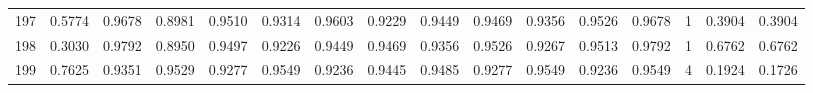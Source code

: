 \begin{tabular}{lrrrrrrrrrrrrrrr}
197 &      0.5774 &  0.9678 &  0.8981 &  0.9510 &  0.9314 &  0.9603 &  0.9229 &  0.9449 &  0.9469 &  0.9356 &   0.9526 &     0.9678 &      1 &                    0.3904 &                     0.3904 \\
198 &      0.3030 &  0.9792 &  0.8950 &  0.9497 &  0.9226 &  0.9449 &  0.9469 &  0.9356 &  0.9526 &  0.9267 &   0.9513 &     0.9792 &      1 &                    0.6762 &                     0.6762 \\
199 &      0.7625 &  0.9351 &  0.9529 &  0.9277 &  0.9549 &  0.9236 &  0.9445 &  0.9485 &  0.9277 &  0.9549 &   0.9236 &     0.9549 &      4 &                    0.1924 &                     0.1726 \\
\bottomrule
\end{tabular}
